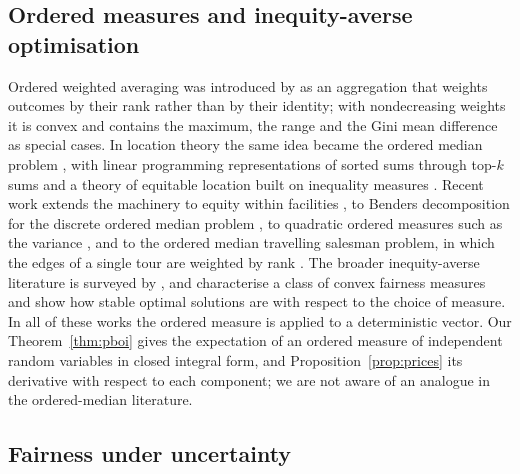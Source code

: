\documentclass[11pt]{article}
\theoremstyle{definition}
\begin{document}
\subsection{Ordered measures and inequity-averse optimisation}

Ordered weighted averaging was introduced by \citet{yager1988owa} as an
aggregation that weights outcomes by their rank rather than by their
identity; with nondecreasing weights it is convex and contains the maximum,
the range and the Gini mean difference as special cases. In location theory
the same idea became the ordered median problem
\citep{nickel2005location}, with linear programming representations of
sorted sums through top-$k$ sums \citep{ogryczak2003minimizing,ogryczak2003solving}
and a theory of equitable location built on inequality measures
\citep{ogryczak2000inequality}. Recent work extends the machinery to equity
within facilities \citep{blanco2024intra}, to Benders decomposition for the
discrete ordered median problem \citep{ljubic2024benders}, to quadratic
ordered measures such as the variance \citep{blanco2026optimization}, and to
the ordered median travelling salesman problem, in which the edges of a
single tour are weighted by rank \citep{ljubic2026ordered}. The broader
inequity-averse literature is surveyed by \citet{karsu2015inequity}, and
\citet{tsang2026unified} characterise a class of convex fairness measures and
show how stable optimal solutions are with respect to the choice of measure.
In all of these works the ordered measure is applied to a deterministic
vector. Our Theorem~\ref{thm:pboi} gives the expectation of an ordered
measure of independent random variables in closed integral form, and
Proposition~\ref{prop:prices} its derivative with respect to each component;
we are not aware of an analogue in the ordered-median literature.

\subsection{Fairness under uncertainty}
\end{document}

